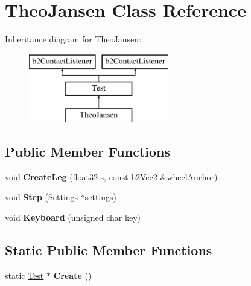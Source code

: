 \hypertarget{class_theo_jansen}{\section{Theo\-Jansen Class Reference}
\label{class_theo_jansen}
}
Inheritance diagram for Theo\-Jansen\-:\begin{figure}[H]
\begin{center}
\leavevmode
\includegraphics[height=3.000000cm]{class_theo_jansen}
\end{center}
\end{figure}
\subsection*{Public Member Functions}
\begin{DoxyCompactItemize}
\item 
\hypertarget{class_theo_jansen_a15ba200803a3b2fd8312d022e80593d2}{void {\bfseries Create\-Leg} (float32 s, const \hyperlink{structb2_vec2}{b2\-Vec2} \&wheel\-Anchor)}\label{class_theo_jansen_a15ba200803a3b2fd8312d022e80593d2}

\item 
\hypertarget{class_theo_jansen_ac61a6c146fbd8fdee41ace7d2df8a1ad}{void {\bfseries Step} (\hyperlink{struct_settings}{Settings} $\ast$settings)}\label{class_theo_jansen_ac61a6c146fbd8fdee41ace7d2df8a1ad}

\item 
\hypertarget{class_theo_jansen_aebeee7bee1d7244a6b3d89dd454c2e0c}{void {\bfseries Keyboard} (unsigned char key)}\label{class_theo_jansen_aebeee7bee1d7244a6b3d89dd454c2e0c}

\end{DoxyCompactItemize}
\subsection*{Static Public Member Functions}
\begin{DoxyCompactItemize}
\item 
\hypertarget{class_theo_jansen_ae49f7477b325a118ae42db3c6a2a8dd7}{static \hyperlink{class_test}{Test} $\ast$ {\bfseries Create} ()}\label{class_theo_jansen_ae49f7477b325a118ae42db3c6a2a8dd7}

\end{DoxyCompactItemize}
